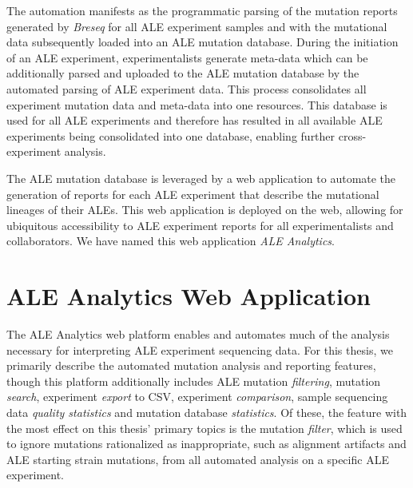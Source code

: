 \documentclass[12pt,final,masters,chapterheads]{ucsd}  %
\begin{document}
The automation manifests as the programmatic parsing of the mutation reports generated by \textit{Breseq} for all ALE experiment samples and with the mutational data subsequently loaded into an ALE mutation database. During the initiation of an ALE experiment, experimentalists generate meta-data which can be additionally parsed and uploaded to the ALE mutation database by the automated parsing of ALE experiment data. This process consolidates all experiment mutation data and meta-data into one resources. This database is used for all ALE experiments and therefore has resulted in all available ALE experiments being consolidated into one database, enabling further cross-experiment analysis.

The ALE mutation database is leveraged by a web application to automate the generation of reports for each ALE experiment that describe the mutational lineages of their ALEs. This web application is deployed on the web, allowing for ubiquitous accessibility to ALE experiment reports for all experimentalists and collaborators. We have named this web application \textit{ALE Analytics}.

\section{ALE Analytics Web Application}

%
%

The ALE Analytics web platform enables and automates much of the analysis necessary for interpreting ALE experiment sequencing data. For this thesis, we primarily describe the automated mutation analysis and reporting features, though this platform additionally includes ALE mutation \textit{filtering}, mutation \textit{search}, experiment \textit{export} to CSV, experiment \textit{comparison}, sample sequencing data \textit{quality statistics} and mutation database \textit{statistics}. Of these, the feature with the most effect on this thesis' primary topics is the mutation \textit{filter}, which is used to ignore mutations rationalized as inappropriate, such as alignment artifacts and ALE starting strain mutations, from all automated analysis on a specific ALE experiment.
\end{document}
